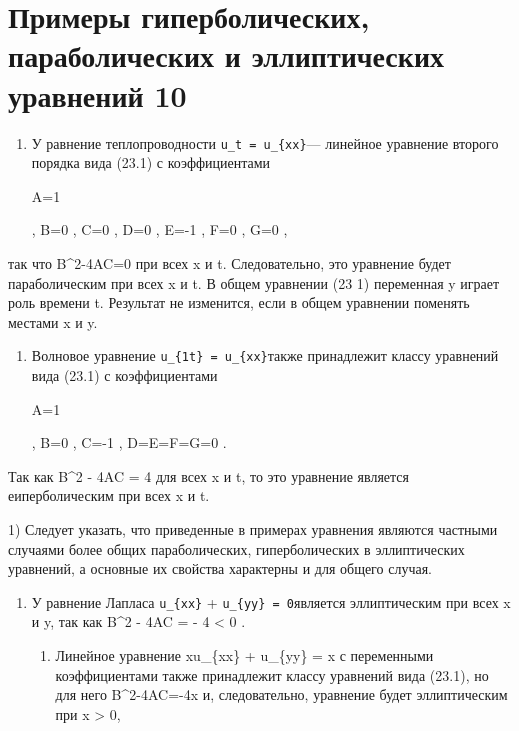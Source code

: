 \documentclass[
  ukrainian,
]{article}
\providecommand{\tightlist}{%
  \setlength{\itemsep}{0pt}\setlength{\parskip}{0pt}}
\begin{document}
\section{Примеры гиперболических, параболических и эллиптических
уравнений
10}\label{ux43fux440ux438ux43cux435ux440ux44b-ux433ux438ux43fux435ux440ux431ux43eux43bux438ux447ux435ux441ux43aux438ux445-ux43fux430ux440ux430ux431ux43eux43bux438ux447ux435ux441ux43aux438ux445-ux438-ux44dux43bux43bux438ux43fux442ux438ux447ux435ux441ux43aux438ux445-ux443ux440ux430ux432ux43dux435ux43dux438ux439-10}

\begin{enumerate}
\def\labelenumi{\arabic{enumi}.}
\item
  У равнение теплопроводности \texttt{u\_t\ =\ u\_\{xx\}}--- линейное
  уравнение второго порядка вида (23.1) с коэффициентами

  A=1

  , B=0 , C=0 , D=0 , E=-1 , F=0 , G=0 ,
\end{enumerate}

так что B\^{}2-4AC=0 при всех x и t. Следовательно, это уравнение будет
параболическим при всех x и t. В общем уравнении (23 1) переменная y
играет роль времени t. Результат не изменится, если в общем уравнении
поменять местами x и y.

\begin{enumerate}
\def\labelenumi{\arabic{enumi}.}
\setcounter{enumi}{1}
\item
  Волновое уравнение \texttt{u\_\{1t\}\ =\ u\_\{xx\}}также принадлежит
  классу уравнений вида (23.1) с коэффициентами

  A=1

  , B=0 , C=-1 , D=E=F=G=0 .
\end{enumerate}

Так как B\^{}2 - 4AC = 4 для всех x и t, то это уравнение является
еиперболическим при всех x и t.

1) Следует указать, что приведенные в примерах уравнения являются
частными случаями более общих параболических, гиперболических в
эллиптических уравнений, а основные их свойства характерны и для общего
случая.

\begin{enumerate}
\def\labelenumi{\arabic{enumi}.}
\setcounter{enumi}{2}
\item
  У равнение Лапласа \texttt{u\_\{xx\}} +
  \texttt{u\_\{yy\}\ =\ 0}является эллиптическим при всех x и y, так как
  B\^{}2 - 4AC = - 4 \textless{} 0 .

  \begin{enumerate}
  \def\labelenumii{\arabic{enumii}.}
  \setcounter{enumii}{3}
  \tightlist
  \item
    Линейное уравнение xu\_\{xx\} + u\_\{yy\} = \sin x с переменными
    коэффициентами также принадлежит классу уравнений вида (23.1), но
    для него B\^{}2-4AC=-4x и, следовательно, уравнение будет
    эллиптическим при x \textgreater{} 0,
  \end{enumerate}
\end{enumerate}
\end{document}
